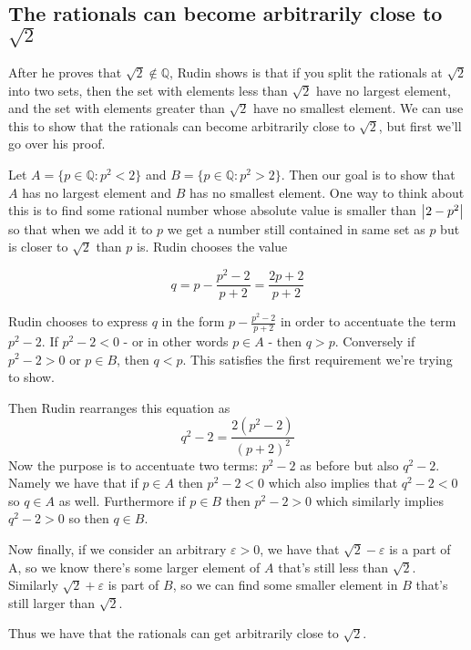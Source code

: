 \documentclass{article}
\newcommand{\Q}{\mathbb{Q}}
\let\endoldproof\endproof
\renewenvironment{proof}[1][\proofname]
  {\begin{adjustwidth}{2em}{2em}
   \oldproof[#1]}
  {\endoldproof
   \end{adjustwidth}}
\begin{document}
\newpage
\subsection*{The rationals can become arbitrarily close to $\sqrt{2}$}
\begin{proof}
After he proves that $\sqrt{2} \not\in \Q$, Rudin shows is that if you split
the rationals at $\sqrt{2}$ into two sets, then the set with elements less than
$\sqrt{2}$ have no largest element, and the set with elements greater than
$\sqrt{2}$ have no smallest element. We can use this to show that the
rationals can become arbitrarily  close to $\sqrt{2}$, but first we'll go over
his proof.

Let $A = \{p \in \Q : p^2 < 2\}$ and $B = \{p \in \Q : p^2 > 2\}$. Then our
goal is to show that $A$ has no largest element and $B$ has no smallest element.
One way to think about this is to find some rational number whose absolute
value is smaller than $\abs{2-p^2}$ so that when we add it to $p$ we get a
number still contained in same set as $p$ but is closer to $\sqrt{2}$ than $p$
is. Rudin chooses the value

\begin{equation*}
q = p - \frac{p^2-2}{p+2} = \frac{2p+2}{p+2}
\end{equation*}

Rudin chooses to express $q$ in the form $p - \frac{p^2-2}{p+2}$ in order to
accentuate the term $p^2 - 2$. If $p^2-2 < 0$ - or in other words $p \in A$ -
then $q > p$. Conversely if $p^2-2 > 0$ or $p \in B$, then $q < p$. This
satisfies the first requirement we're trying to show.

Then Rudin rearranges this equation as
\begin{equation*}
q^2-2 = \frac{2(p^2-2)}{(p+2)^2}
\end{equation*}
Now the purpose is to accentuate two terms: $p^2-2$ as before but also $q^2-2$.
Namely we have that if $p\in A$ then $p^2-2 < 0$ which also implies that
$q^2-2 <0$ so $q\in A$ as well. Furthermore if $p\in B$ then $p^2-2 > 0$ which
similarly implies $q^2-2 > 0$ so then $q\in B$.

Now finally, if we consider an arbitrary $\varepsilon > 0$, we have that
$\sqrt{2} - \varepsilon$ is a part of A, so we know there's some larger element
of $A$ that's still less than $\sqrt{2}$. Similarly $\sqrt{2} + \varepsilon$ is
part of $B$, so we can find some smaller element in $B$ that's still larger
than $\sqrt{2}$.

Thus we have that the rationals can get arbitrarily close to $\sqrt{2}$.
\end{proof}
\end{document}
